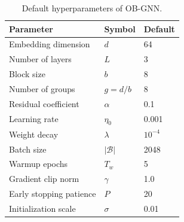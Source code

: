 \begin{table}[h]
\centering
\caption{Default hyperparameters of OB-GNN.}
\label{tab:hyperparams}
\begin{tabular}{lll}
\toprule
\textbf{Parameter} & \textbf{Symbol} & \textbf{Default} \\
\midrule
Embedding dimension       & $d$            & 64 \\
Number of layers          & $L$            & 3 \\
Block size                & $b$            & 8 \\
Number of groups          & $g = d/b$      & 8 \\
Residual coefficient      & $\alpha$       & 0.1 \\
Learning rate             & $\eta_0$       & 0.001 \\
Weight decay              & $\lambda$      & $10^{-4}$ \\
Batch size                & $|\mathcal{B}|$& 2048 \\
Warmup epochs             & $T_w$          & 5 \\
Gradient clip norm        & $\gamma$       & 1.0 \\
Early stopping patience   & $P$            & 20 \\
Initialization scale      & $\sigma$       & 0.01 \\
\bottomrule
\end{tabular}
\end{table}
